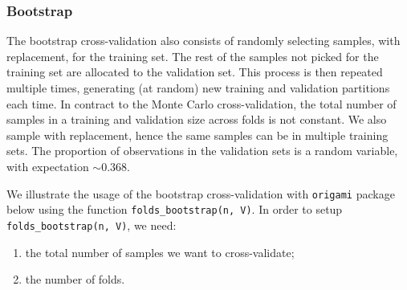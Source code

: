 \documentclass[12pt, krantz2,]{book}
\newenvironment{Shaded}{\begin{snugshade}}{\end{snugshade}}
\newcommand{\CommentTok}[1]{\textcolor[rgb]{0.56,0.35,0.01}{\textit{#1}}}
\newcommand{\DataTypeTok}[1]{\textcolor[rgb]{0.13,0.29,0.53}{#1}}
\newcommand{\DecValTok}[1]{\textcolor[rgb]{0.00,0.00,0.81}{#1}}
\newcommand{\FloatTok}[1]{\textcolor[rgb]{0.00,0.00,0.81}{#1}}
\newcommand{\KeywordTok}[1]{\textcolor[rgb]{0.13,0.29,0.53}{\textbf{#1}}}
\newcommand{\NormalTok}[1]{#1}
\newcommand{\StringTok}[1]{\textcolor[rgb]{0.31,0.60,0.02}{#1}}
\providecommand{\tightlist}{%
  \setlength{\itemsep}{0pt}\setlength{\parskip}{0pt}}
\theoremstyle{definition}
\theoremstyle{definition}
\theoremstyle{definition}
\newcommand{\1}{\mathbbm{1}}
\begin{document}
\begin{Shaded}
\end{Shaded}

\hypertarget{bootstrap}{%
\subsubsection{Bootstrap}\label{bootstrap}}

The bootstrap cross-validation also consists of randomly selecting samples, with
replacement, for the training set. The rest of the samples not picked for the
training set are allocated to the validation set. This process is then repeated
multiple times, generating (at random) new training and validation partitions
each time. In contract to the Monte Carlo cross-validation, the total number of
samples in a training and validation size across folds is not constant. We also
sample with replacement, hence the same samples can be in multiple training
sets. The proportion of observations in the validation sets is a random
variable, with expectation \(\sim 0.368\).

We illustrate the usage of the bootstrap cross-validation with \texttt{origami} package
below using the function \texttt{folds\_bootstrap(n,\ V)}. In order to setup
\texttt{folds\_bootstrap(n,\ V)}, we need:

\begin{enumerate}
\def\labelenumi{\arabic{enumi}.}
\tightlist
\item
  the total number of samples we want to cross-validate;
\item
  the number of folds.
\end{enumerate}
\end{document}
